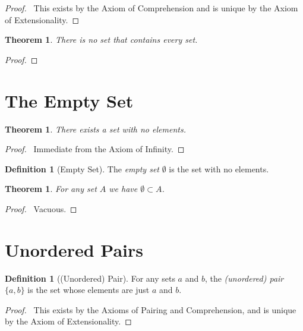 \documentclass{report}
\let\qed\relax
\newtheorem{thm}[ax]{Theorem}
\theoremstyle{definition}
\newtheorem{df}[ax]{Definition}
\begin{document}
\begin{proof}
\pf\ This exists by the Axiom of Comprehension and is unique by the Axiom of Extensionality. \qed
\end{proof}

\begin{thm}
There is no set that contains every set.
\end{thm}

\begin{proof}
\pf
{}
\qed
\end{proof}

\section{The Empty Set}

\begin{thm}
There exists a set with no elements.
\end{thm}

\begin{proof}
\pf\ Immediate from the Axiom of Infinity. \qed
\end{proof}

\begin{df}[Empty Set]
The \emph{empty set} $\emptyset$ is the set with no elements.
\end{df}

\begin{thm}
For any set $A$ we have $\emptyset \subset A$.
\end{thm}

\begin{proof}
\pf\ Vacuous. \qed
\end{proof}

\section{Unordered Pairs}

\begin{df}[(Unordered) Pair]
For any sets $a$ and $b$, the \emph{(unordered) pair} $\{a,b\}$ is the set whose elements are just $a$ and $b$.
\end{df}

\begin{proof}
\pf\ This exists by the Axioms of Pairing and Comprehension, and is unique by the Axiom of Extensionality. \qed
\end{proof}
\end{document}
